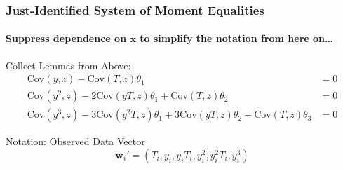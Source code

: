 \documentclass{beamer}
\begin{document}
\begin{frame}
  \frametitle{Just-Identified System of Moment Equalities}
  \framesubtitle{Suppress dependence on $\mathbf{x}$ to simplify the notation from here on\dots}

  \begin{block}{Collect Lemmas from Above:}
\small
\vspace{-2em}
\begin{align*}
  \mbox{Cov}(y,z) - \mbox{Cov}(T,z) \theta_1 &= 0\\
  \mbox{Cov}(y^2,z) - 2\mbox{Cov}(yT,z) \theta_1 + \mbox{Cov}(T,z)\theta_2 &= 0\\
  \mbox{Cov}(y^3,z) - 3 \mbox{Cov}(y^2T,z) \theta_1 + 3\mbox{Cov}(yT,z) \theta_2 - \mbox{Cov}(T,z) \theta_3 &= 0
\end{align*}
\end{block}

\begin{block}{Notation: Observed Data Vector}
  \vspace{-1.5em}
  \[
\mathbf{w}_i' = (T_i, y_i, y_iT_i, y_i^2, y_i^2 T_i, y_i^3)
\]
\end{block}
\end{frame}
\end{document}
